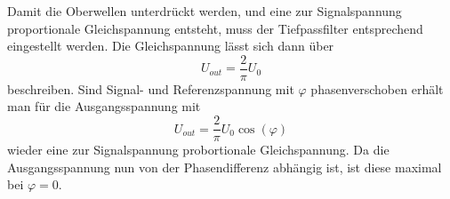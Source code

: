 Damit die Oberwellen unterdrückt werden, und eine zur Signalspannung proportionale
Gleichspannung entsteht, muss der Tiefpassfilter entsprechend eingestellt werden.
Die Gleichspannung lässt sich dann über
\begin{equation}
  U_{out}=\frac{2}{\pi}U_0
\end{equation}
beschreiben.
Sind Signal- und Referenzspannung mit $\varphi$ phasenverschoben erhält man für
die Ausgangsspannung mit
\begin{equation}
  U_{out}=\frac{2}{\pi}U_0\cos(\varphi) \label{eqn:out}
\end{equation}
wieder eine zur Signalspannung probortionale Gleichspannung. Da die Ausgangsspannung
nun von der Phasendifferenz abhängig ist, ist diese maximal bei $\varphi=0$.
